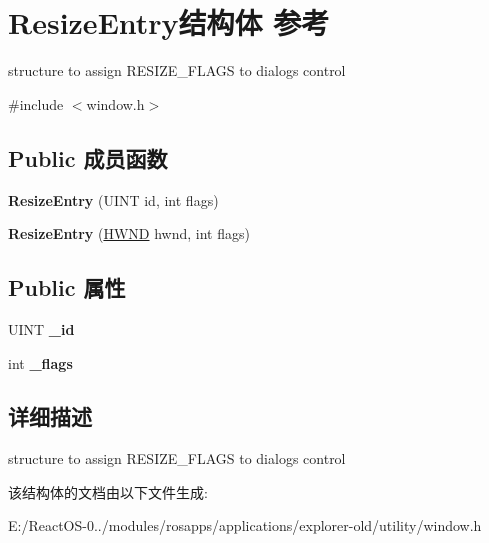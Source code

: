 \hypertarget{struct_resize_entry}{}\section{Resize\+Entry结构体 参考}
\label{struct_resize_entry}


structure to assign R\+E\+S\+I\+Z\+E\+\_\+\+F\+L\+A\+GS to dialogs control  




{\ttfamily \#include $<$window.\+h$>$}

\subsection*{Public 成员函数}
\begin{DoxyCompactItemize}
\item 
\mbox{\label{struct_resize_entry_a0cae8ddc892baefa09b417360973d94a}} 
{\bfseries Resize\+Entry} (U\+I\+NT id, int flags)
\item 
\mbox{\label{struct_resize_entry_ac6edf61c8e3aa0e57132ce3e2334bb69}} 
{\bfseries Resize\+Entry} (\hyperlink{interfacevoid}{H\+W\+ND} hwnd, int flags)
\end{DoxyCompactItemize}
\subsection*{Public 属性}
\begin{DoxyCompactItemize}
\item 
\mbox{\label{struct_resize_entry_afef45fd0583ecca5fb63946b71b2fdf2}} 
U\+I\+NT {\bfseries \+\_\+id}
\item 
\mbox{\label{struct_resize_entry_a30cfad1703d71cc2e8bab163aebad157}} 
int {\bfseries \+\_\+flags}
\end{DoxyCompactItemize}


\subsection{详细描述}
structure to assign R\+E\+S\+I\+Z\+E\+\_\+\+F\+L\+A\+GS to dialogs control 

该结构体的文档由以下文件生成\+:\begin{DoxyCompactItemize}
\item 
E\+:/\+React\+O\+S-\/0../modules/rosapps/applications/explorer-\/old/utility/window.\+h\end{DoxyCompactItemize}
